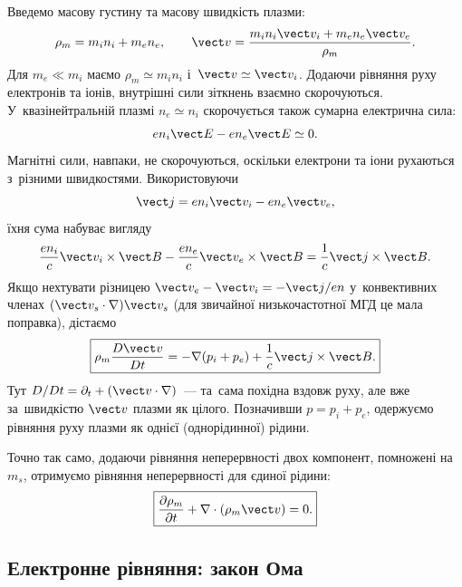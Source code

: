 Введемо масову густину та масову швидкість плазми:
\begin{equation*}
\rho_m=m_i n_i+m_e n_e,
\qquad
\vect v=
\frac{m_i n_i\vect v_i+m_e n_e\vect v_e}{\rho_m}.
\end{equation*}
Для $m_e\ll m_i$ маємо $\rho_m\simeq m_i n_i$ і~$\vect v\simeq\vect v_i$. Додаючи рівняння
руху електронів та іонів, внутрішні сили зіткнень взаємно скорочуються. У~квазінейтральній
плазмі $ n_e\simeq n_i$ скорочується також сумарна електрична сила:
\begin{equation*}
en_i\vect E-en_e\vect E\simeq0.
\end{equation*}
Магнітні сили, навпаки, не скорочуються, оскільки електрони та іони рухаються з~різними
швидкостями. Використовуючи
\begin{equation*}
\vect j=e n_i\vect v_i-e n_e\vect v_e,
\end{equation*}
їхня сума набуває вигляду
\begin{equation*}
\frac{e n_i}{c}\vect v_i\times\vect B
-
\frac{e n_e}{c}\vect v_e\times\vect B
=
\frac1c\vect j\times\vect B.
\end{equation*}
Якщо нехтувати різницею $\vect v_e-\vect v_i=-\vect j/en$ у~конвективних членах $(\vect v_s\cdot\nabla)\vect v_s$
(для звичайної низькочастотної МГД це мала поправка), дістаємо
\begin{equation}\label{eq:one-fluid-momentum-from-two-fluid}
\boxed{
\rho_m\frac{D\vect v}{Dt}
=
-\nabla(p_i+p_e)
+
\frac1c\vect j\times\vect B.
}
\end{equation}
Тут $D/Dt=\partial_t+(\vect v\cdot\nabla)$~--- та~сама похідна вздовж руху, але вже за~швидкістю $\vect v$ плазми як цілого. Позначивши $p=p_i+p_e$, одержуємо рівняння руху плазми як однієї (однорідинної) рідини.

Точно так само, додаючи рівняння неперервності двох компонент, помножені на~$m_s$, отримуємо рівняння
неперервності для єдиної рідини:
\begin{equation}\label{eq:one-fluid-continuity-from-two-fluid}
\boxed{
\frac{\partial\rho_m}{\partial t}
+
\nabla\cdot(\rho_m\vect v)=0.
}
\end{equation}


\subsection*{Електронне рівняння: закон Ома}


